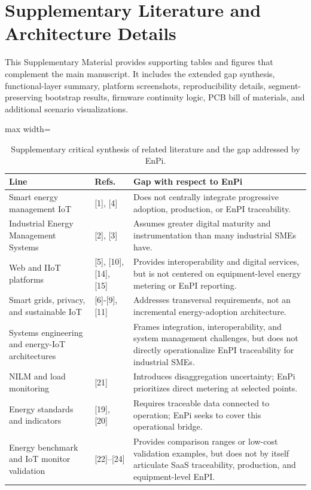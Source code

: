 \documentclass[technologies,article,submit,pdftex,moreauthors]{Definitions/mdpi}
\begin{document}
\section{Supplementary Literature and Architecture Details}
This Supplementary Material provides supporting tables and figures that complement the main manuscript. It includes the extended gap synthesis, functional-layer summary, platform screenshots, reproducibility details, segment-preserving bootstrap results, firmware continuity logic, PCB bill of materials, and additional scenario visualizations.

\begin{table}[H]
\caption{Supplementary critical synthesis of related literature and the gap addressed by EnPi.}
\label{tab:S1}
\centering
\scriptsize
\begin{adjustbox}{max width=\columnwidth}
\begin{tabular}{p{}p{}p{}}
\toprule
Line & Refs. & Gap with respect to EnPi \\
\midrule
Smart energy management IoT & [1], [4] & Does not centrally integrate progressive adoption, production, or EnPI traceability. \\
Industrial Energy Management Systems & [2], [3] & Assumes greater digital maturity and instrumentation than many industrial SMEs have. \\
Web and IIoT platforms & [5], [10], [14], [15] & Provides interoperability and digital services, but is not centered on equipment-level energy metering or EnPI reporting. \\
Smart grids, privacy, and sustainable IoT & [6]-[9], [11] & Addresses transversal requirements, not an incremental energy-adoption architecture. \\
Systems engineering and energy-IoT architectures & \cite{ref26,ref27,ref28} & Frames integration, interoperability, and system management challenges, but does not directly operationalize EnPI traceability for industrial SMEs. \\
NILM and load monitoring & [21] & Introduces disaggregation uncertainty; EnPi prioritizes direct metering at selected points. \\
Energy standards and indicators & [19], [20] & Requires traceable data connected to operation; EnPi seeks to cover this operational bridge. \\
Energy benchmark and IoT monitor validation & [22]--[24] & Provides comparison ranges or low-cost validation examples, but does not by itself articulate SaaS traceability, production, and equipment-level EnPI. \\
\bottomrule
\end{tabular}
\end{adjustbox}
\end{table}
\end{document}
